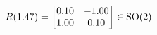 \documentclass[preview]{standalone}
\begin{document}
\begin{align*}
\special{dvisvgm:raw <g id='unique000'>}R(1.47) = \begin{bmatrix} 0.10 & -1.00 \\ 1.00 & 0.10 \end{bmatrix} \in \text{SO}(2)\special{dvisvgm:raw </g>}
\end{align*}
\end{document}
